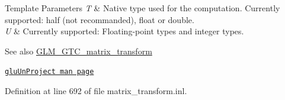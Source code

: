 \begin{DoxyTemplParams}{Template Parameters}
{\em T} & Native type used for the computation. Currently supported\+: half (not recommanded), float or double. \\
\hline
{\em U} & Currently supported\+: Floating-\/point types and integer types. \\
\hline
\end{DoxyTemplParams}
\begin{DoxySeeAlso}{See also}
\hyperlink{group__gtc__matrix__transform}{G\+L\+M\+\_\+\+G\+T\+C\+\_\+matrix\+\_\+transform} 

\href{https://www.khronos.org/registry/OpenGL-Refpages/gl2.1/xhtml/gluUnProject.xml}{\tt glu\+Un\+Project man page} 
\end{DoxySeeAlso}


Definition at line 692 of file matrix\+\_\+transform.\+inl.


